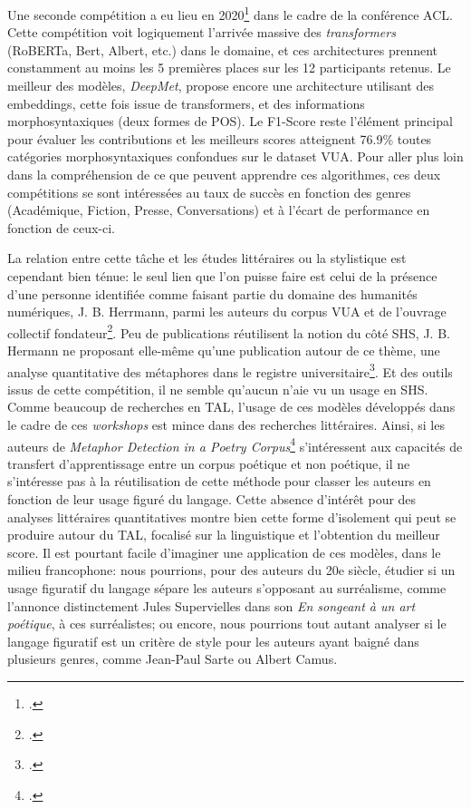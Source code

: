 Une seconde compétition a eu lieu en 2020\footcite{leong_report_2020} dans le cadre de la conférence ACL. Cette compétition voit logiquement l'arrivée massive des \textit{transformers} (RoBERTa, Bert, Albert, etc.) dans le domaine, et ces architectures prennent constamment au moins les 5 premières places sur les 12 participants retenus. Le meilleur des modèles, \textit{DeepMet}, propose encore une architecture utilisant des embeddings, cette fois issue de transformers, et des informations morphosyntaxiques (deux formes de POS). Le F1-Score reste l'élément principal pour évaluer les contributions et les meilleurs scores atteignent 76.9\% toutes catégories morphosyntaxiques confondues sur le dataset VUA. Pour aller plus loin dans la compréhension de ce que peuvent apprendre ces algorithmes, ces deux compétitions se sont intéressées au taux de succès en fonction des genres (Académique, Fiction, Presse, Conversations) et à l'écart de performance en fonction de ceux-ci. %

La relation entre cette tâche et les études littéraires ou la stylistique est cependant bien ténue: le seul lien que l'on puisse faire est celui de la présence d'une personne identifiée comme faisant partie du domaine des humanités numériques, J. B. Herrmann, parmi les auteurs du corpus VUA et de l'ouvrage collectif fondateur\footcite{steen_method_2010}. Peu de publications réutilisent la notion du côté SHS, J. B. Hermann ne proposant elle-même qu'une publication autour de ce thème, une analyse quantitative des métaphores dans le registre universitaire\footcite{herrmann_high_2015}. Et des outils issus de cette compétition, il ne semble qu'aucun n'aie vu un usage en SHS. Comme beaucoup de recherches en TAL, l'usage de ces modèles développés dans le cadre de ces \textit{workshops} est mince dans des recherches littéraires. Ainsi, si les auteurs de \textit{Metaphor Detection in a Poetry Corpus}\footcite{kesarwani_metaphor_2017} s'intéressent aux capacités de transfert d'apprentissage entre un corpus poétique et non poétique, il ne s'intéresse pas à la réutilisation de cette méthode pour classer les auteurs en fonction de leur usage figuré du langage. Cette absence d'intérêt pour des analyses littéraires quantitatives montre bien cette forme d'isolement qui peut se produire autour du TAL, focalisé sur la linguistique et l'obtention du meilleur score. Il est pourtant facile d'imaginer une application de ces modèles, dans le milieu francophone: nous pourrions, pour des auteurs du 20e siècle, étudier si un usage figuratif du langage sépare les auteurs s'opposant au surréalisme, comme l'annonce distinctement Jules Supervielles dans son \textit{En songeant à un art poétique}, à ces surréalistes; ou encore, nous pourrions tout autant analyser si le langage figuratif est un critère de style pour les auteurs ayant baigné dans plusieurs genres, comme Jean-Paul Sarte ou Albert Camus.

